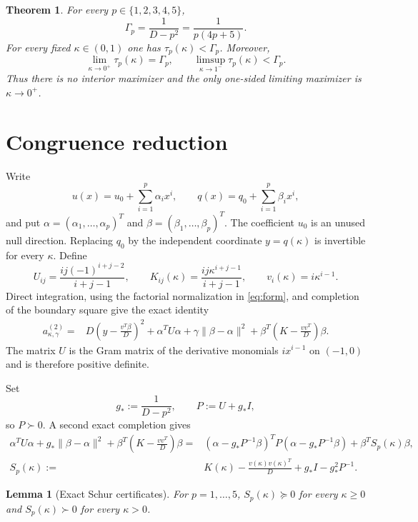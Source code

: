 \documentclass[11pt]{article}
\newtheorem{theorem}{Theorem}
\newtheorem{lemma}{Lemma}
\begin{document}
\begin{theorem}\label{thm:main}
For every $p\in\{1,2,3,4,5\}$,
\[
 \Gamma_p=\frac1{D-p^2}=\frac1{p(4p+5)}.
\]
For every fixed $\kappa\in(0,1)$ one has
$\tau_p(\kappa)<\Gamma_p$.  Moreover,
\[
 \lim_{\kappa\to0^+}\tau_p(\kappa)=\Gamma_p,
 \qquad
 \limsup_{\kappa\to1^-}\tau_p(\kappa)<\Gamma_p.
\]
Thus there is no interior maximizer and the only one-sided limiting
maximizer is $\kappa\to0^+$.
\end{theorem}

\section{Congruence reduction}

Write
\[
 u(x)=u_0+\sum_{i=1}^p\alpha_i x^i,
 \qquad q(x)=q_0+\sum_{i=1}^p\beta_i x^i,
\]
and put $\alpha=(\alpha_1,\ldots,\alpha_p)^T$ and
$\beta=(\beta_1,\ldots,\beta_p)^T$.  The coefficient $u_0$ is an
unused null direction.  Replacing $q_0$ by the independent coordinate
$y=q(\kappa)$ is invertible for every $\kappa$.  Define
\begin{equation}
 U_{ij}=\frac{ij(-1)^{i+j-2}}{i+j-1},\qquad
 K_{ij}(\kappa)=\frac{ij\kappa^{i+j-1}}{i+j-1},\qquad
 v_i(\kappa)=i\kappa^{i-1}.                              \label{eq:UKv}
\end{equation}
Direct integration, using the factorial normalization in
\eqref{eq:form}, and completion of the boundary square give the exact
identity
\begin{align}
a^{(2)}_{\kappa,\gamma}
={}&D\left(y-\frac{v^T\beta}{D}\right)^2
+\alpha^TU\alpha+\gamma\|\beta-\alpha\|^2
+\beta^T\left(K-\frac{vv^T}{D}\right)\beta .             \label{eq:firstsquare}
\end{align}
The matrix $U$ is the Gram matrix of the derivative monomials
$ix^{i-1}$ on $(-1,0)$ and is therefore positive definite.

Set
\[
 g_*:=\frac1{D-p^2},\qquad P:=U+g_*I,
\]
so $P\succ0$.  A second exact completion gives
\begin{align}
\alpha^TU\alpha+g_*\|\beta-\alpha\|^2
+\beta^T\left(K-\frac{vv^T}{D}\right)\beta
={}&(\alpha-g_*P^{-1}\beta)^TP(\alpha-g_*P^{-1}\beta)
+\beta^TS_p(\kappa)\beta,                                \label{eq:secondsquare}\\
S_p(\kappa):={}&K(\kappa)-\frac{v(\kappa)v(\kappa)^T}{D}
+g_*I-g_*^2P^{-1}.                                        \label{eq:schur}
\end{align}

\begin{lemma}[Exact Schur certificates]\label{lem:cert}
For $p=1,\ldots,5$, $S_p(\kappa)\succeq0$ for every
$\kappa\ge0$ and $S_p(\kappa)\succ0$ for every $\kappa>0$.
\end{lemma}
\end{document}
